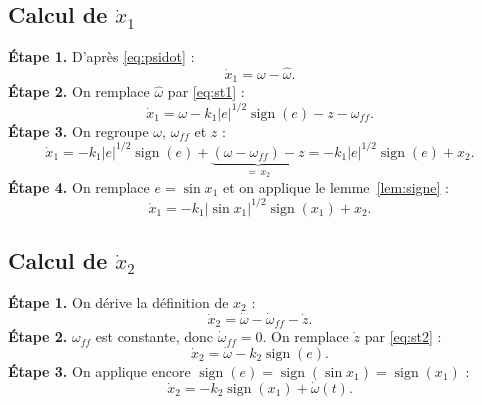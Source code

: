 \documentclass[11pt,a4paper]{article}
\numberwithin{equation}{section}
\theoremstyle{plain}
\theoremstyle{definition}
\theoremstyle{remark}
\newcommand{\sign}{\operatorname{sign}}
\newcommand{\hw}{\hat{\omega}}
\newcommand{\wff}{\omega_{ff}}
\begin{document}
\subsection{Calcul de $\dot x_1$}
\textbf{Étape 1.} D'après \eqref{eq:psidot} :
\begin{equation}
\dot x_1 = \omega-\hw .
\end{equation}
\textbf{Étape 2.} On remplace $\hw$ par \eqref{eq:st1} :
\begin{equation}
\dot x_1 = \omega - k_1|e|^{1/2}\sign(e) - z - \wff .
\end{equation}
\textbf{Étape 3.} On regroupe $\omega$, $\wff$ et $z$ :
\begin{equation}
\dot x_1 = -k_1|e|^{1/2}\sign(e) + \underbrace{(\omega-\wff)-z}_{=\,x_2}
        = -k_1|e|^{1/2}\sign(e) + x_2 .
\end{equation}
\textbf{Étape 4.} On remplace $e=\sin x_1$ et on applique le lemme~\ref{lem:signe} :
\begin{equation}\label{eq:x1dot}
\boxed{\dot x_1 = -k_1|\sin x_1|^{1/2}\sign(x_1) + x_2 .}
\end{equation}

\subsection{Calcul de $\dot x_2$}
\textbf{Étape 1.} On dérive la définition de $x_2$ :
\begin{equation}
\dot x_2 = \dot\omega - \dot\omega_{ff} - \dot z .
\end{equation}
\textbf{Étape 2.} $\wff$ est constante, donc $\dot\omega_{ff}=0$. On remplace $\dot z$ par \eqref{eq:st2} :
\begin{equation}
\dot x_2 = \dot\omega - k_2\sign(e) .
\end{equation}
\textbf{Étape 3.} On applique encore $\sign(e)=\sign(\sin x_1)=\sign(x_1)$ :
\begin{equation}\label{eq:x2dot}
\boxed{\dot x_2 = -k_2\sign(x_1) + \dot\omega(t) .}
\end{equation}
\end{document}
